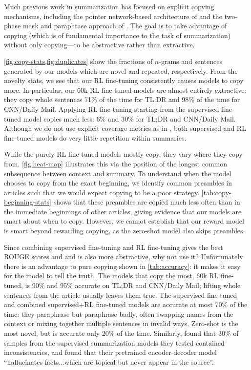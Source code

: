Much previous work in summarization has focused on explicit copying mechanisms, including the pointer network-based architecture of \citet{see2017get} and the two-phase mask and paraphrase approach of \citet{gehrmann2018bottom}.  The goal is to take advantage of copying (which is of fundamental importance to the task of summarization) without only copying---to be abstractive rather than extractive.

\ref{fig:copy-stats,fig:duplicates} show the fractions of $n$-grams and sentences generated by our models which are novel and repeated, respectively. From the novelty stats, we see that our RL fine-tuning consistently causes models to copy more. In particular, our 60k RL fine-tuned models are almost entirely extractive: they copy whole sentences 71\% of the time for TL;DR and 98\% of the time for CNN/Daily Mail.  Applying RL fine-tuning starting from the supervised fine-tuned model copies much less: 6\% and 30\% for TL;DR and CNN/Daily Mail. Although we do not use explicit coverage metrics as in \citet{see2017get,gehrmann2018bottom}, both supervised and RL fine-tuned models do very little repetition within summaries.  

While the purely RL fine-tuned models mostly copy, they vary where they copy from. \ref{fig:heat-map} illustrates this via the position of the longest common subsequence between context and summary.  To understand when the model chooses to copy from the exact beginning, we identify common preambles in articles such that we would expect copying to be a poor strategy.  \ref{tab:copy-beginning-stats} shows that these preambles are copied much less often than in the immediate beginnings of other articles, giving evidence that our models are smart about when to copy.  However, we cannot establish that our reward model is smart beyond rewarding copying, as the zero-shot model also skips preambles.

Since combining supervised fine-tuning and RL fine-tuning gives the best ROUGE scores and and is also more abstractive, why not use it?  Unfortunately there is an advantage to pure copying shown in \ref{tab:accuracy}: it makes it easy for the model to tell the truth.  The models that copy the most, 60k RL fine-tuned, is 90\% and 95\% accurate on TL;DR and CNN/Daily Mail; lifting whole sentences from the article usually leaves them true.  The supervised fine-tuned and combined supervised+RL fine-tuned models are accurate at most 70\% of the time: they paraphrase but paraphrase badly, often swapping names from the context or mixing together multiple sentences in invalid ways.  Zero-shot is the most novel, but is accurate only 20\% of the time.  Similarly, \citet{kryscinski2019neural} found that 30\% of samples from the supervised summarization models they tested contained inconsistencies, and \citet{khandelwal2019sample} found that their pretrained encoder-decoder model ``hallucinates facts...which are topical but never appear in the source''.

